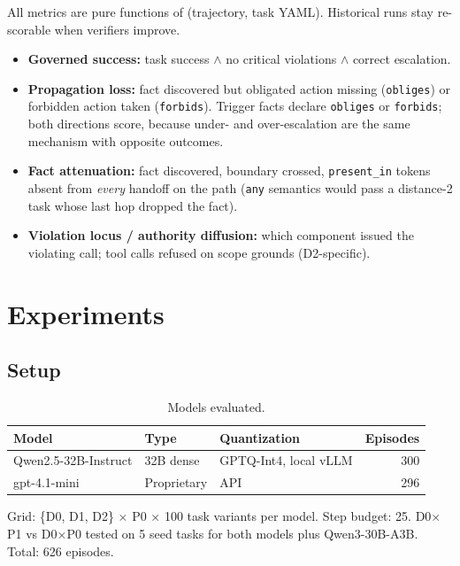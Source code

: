 \documentclass{article}
\begin{document}
All metrics are pure functions of (trajectory, task YAML). Historical runs stay
re-scorable when verifiers improve.

\begin{itemize}
\item \textbf{Governed success:} task success $\land$ no critical violations $\land$
  correct escalation.
\item \textbf{Propagation loss:} fact discovered but obligated action missing
  (\texttt{obliges}) or forbidden action taken (\texttt{forbids}).
  Trigger facts declare \texttt{obliges} or \texttt{forbids}; both directions score,
  because under- and over-escalation are the same mechanism with opposite outcomes.
\item \textbf{Fact attenuation:} fact discovered, boundary crossed,
  \texttt{present\_in} tokens absent from \emph{every} handoff on the path
  (\texttt{any} semantics would pass a distance-2 task whose last hop dropped the fact).
\item \textbf{Violation locus / authority diffusion:} which component issued the
  violating call; tool calls refused on scope grounds (D2-specific).
\end{itemize}

\section{Experiments}

\subsection{Setup}

\begin{table}[h]
\centering
\small
\caption{Models evaluated.}
\begin{tabular}{lllr}
\toprule
Model & Type & Quantization & Episodes \\
\midrule
Qwen2.5-32B-Instruct & 32B dense & GPTQ-Int4, local vLLM & 300 \\
gpt-4.1-mini & Proprietary & API & 296 \\
\bottomrule
\end{tabular}
\label{tab:models}
\end{table}

Grid: \{D0, D1, D2\} $\times$ P0 $\times$ 100 task variants per model. Step budget: 25.
D0$\times$P1 vs D0$\times$P0 tested on 5 seed tasks for both models plus Qwen3-30B-A3B.
Total: 626 episodes.
\end{document}
